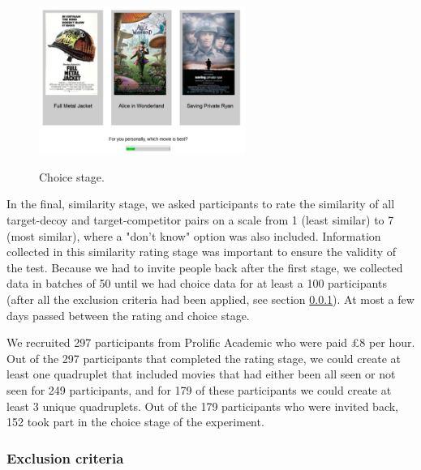 \documentclass[12pt, a4paper]{article}
\begin{document}
\begin{figure}[htb!]
\centering
\captionsetup{justification=centering}
\caption{Choice stage.}
\includegraphics[width=0.6\textwidth]{rsz_exp1_choicestage.png}
\label{fig:exp1_screenshot}
\end{figure}



 In the final, similarity stage, we asked participants to rate the similarity of all target-decoy and target-competitor pairs on a scale from 1 (least similar) to 7 (most similar), where a "don't know" option was also included. Information collected in this similarity rating stage was important to ensure the validity of the test. Because we had to invite people back after the first stage, we collected data in batches of 50 until we had choice data for at least a 100 participants (after all the exclusion criteria had been applied, see section \ref{exclusion_ref}). At most a few days passed between the rating and choice stage.
 
  We recruited 297 participants from Prolific Academic who were paid £8 per hour. Out of the 297 participants that completed the rating stage, we could create at least one quadruplet that included movies that had either been all seen or not seen for 249 participants, and for 179 of these participants we could create at least 3 unique quadruplets. Out of the 179 participants who were invited back, 152 took part in the choice stage of the experiment.  
  



\subsubsection{Exclusion criteria} \label{exclusion_ref}
\end{document}

